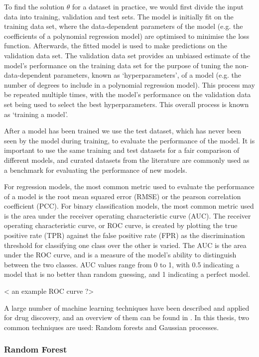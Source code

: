 To find the solution $\hat{\theta}$ for a dataset in practice, we would first divide the input data into training, validation and test sets. The model is initially fit on the training data set, where the data-dependent parameters of the model (e.g. the coefficients of a polynomial regression model) are optimised to minimise the loss function. Afterwards, the fitted model is used to make predictions on the validation data set. The validation data set provides an unbiased estimate of the model's performance on the training data set for the purpose of tuning the non-data-dependent parameters, known as `hyperparameters', of a model (e.g. the number of degrees to include in a polynomial regression model). This process may be repeated multiple times, with the model's performance on the validation data set being used to select the best hyperparameters. This overall process is known as `training a model'.

After a model has been trained we use the test dataset, which has never been seen by the model during training, to evaluate the performance of the model. It is important to use the same training and test datasets for a fair comparison of different models, and curated datasets from the literature are commonly used as a benchmark for evaluating the performance of new models.

For regression models, the most common metric used to evaluate the performance of a model is the root mean squared error (RMSE) or the pearson correlation coefficient (PCC). For binary classification models, the most common metric used is the area under the receiver operating characteristic curve (AUC). The receiver operating characteristic curve, or ROC curve, is created by plotting the true positive rate (TPR) against the false positive rate (FPR) as the discrimination threshold for classifying one class over the other is varied. The AUC is the area under the ROC curve, and is a measure of the model's ability to distinguish between the two classes. AUC values range from 0 to 1, with 0.5 indicating a model that is no better than random guessing, and 1 indicating a perfect model.

< an example ROC curve ?>

A large number of machine learning techniques have been described and applied for drug discovery, and an overview of them can be found in \cite{Bender2021part1,Bender2021part2,Volkamer2023review}. In this thesis, two common techniques are used: Random forests and Gaussian processes.

\subsubsection{Random Forest}


